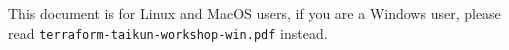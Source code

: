 \begin{warn}
  This document is for Linux and MacOS users, if you are a Windows user, please read \texttt{terraform-taikun-workshop-win.pdf} instead.
\end{warn}
